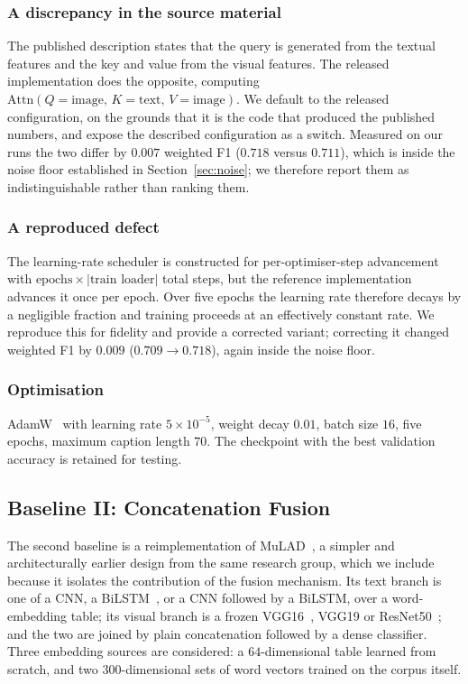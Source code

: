 \documentclass[conference]{IEEEtran}
\begin{document}
\subsubsection{A discrepancy in the source material}
The published description states that the query is generated from the textual
features and the key and value from the visual features. The released
implementation does the opposite, computing
$\mathrm{Attn}(Q{=}\text{image},\,K{=}\text{text},\,V{=}\text{image})$. We
default to the released configuration, on the grounds that it is the code that
produced the published numbers, and expose the described configuration as a
switch. Measured on our runs the two differ by $0.007$ weighted F1
($0.718$ versus $0.711$), which is inside the noise floor established in
Section~\ref{sec:noise}; we therefore report them as indistinguishable rather
than ranking them.

\subsubsection{A reproduced defect}
The learning-rate scheduler is constructed for per-optimiser-step advancement
with $\text{epochs} \times |\text{train loader}|$ total steps, but the reference
implementation advances it once per epoch. Over five epochs the learning rate
therefore decays by a negligible fraction and training proceeds at an
effectively constant rate. We reproduce this for fidelity and provide a
corrected variant; correcting it changed weighted F1 by $0.009$
($0.709 \rightarrow 0.718$), again inside the noise floor.

\subsubsection{Optimisation}
AdamW~\cite{loshchilov2019} with learning rate $5\times10^{-5}$, weight decay
$0.01$, batch size $16$, five epochs, maximum caption length $70$. The
checkpoint with the best validation accuracy is retained for testing.

\subsection{Baseline II: Concatenation Fusion}
\label{sec:mulad}

The second baseline is a reimplementation of MuLAD~\cite{hasan2025mulad}, a
simpler and architecturally earlier design from the same research group, which
we include because it isolates the contribution of the fusion mechanism. Its
text branch is one of a CNN, a BiLSTM~\cite{hochreiter1997}, or a CNN followed
by a BiLSTM, over a word-embedding table; its visual branch is a frozen
VGG16~\cite{simonyan2015}, VGG19 or ResNet50~\cite{he2016}; and the two are
joined by plain concatenation followed by a dense classifier. Three embedding
sources are considered: a $64$-dimensional table learned from scratch, and two
$300$-dimensional sets of word vectors trained on the corpus itself.
\end{document}

